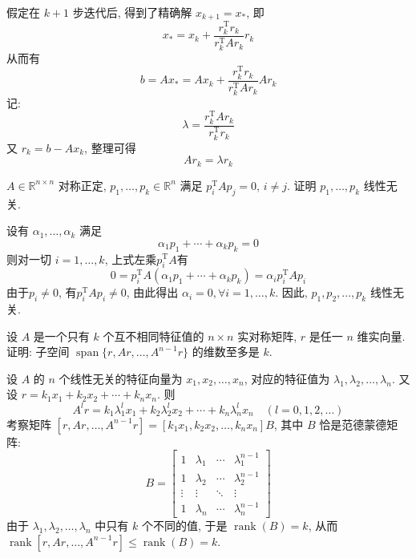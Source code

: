\documentclass[12pt, answers]{exam}     %
\newcommand{\R}{\mathbb{R}}
\newcommand{\T}{\mathrm{T}}
\begin{document}
\begin{questions}
\begin{solution}
假定在 \( k+1 \) 步迭代后, 得到了精确解 \( x_{k+1} = x_* \), 即
\[ x_* = x_k + \frac{r_k^{\T} r_k}{r_k^{\T} A r_k} r_k \]
从而有
\[ b = A x_* = A x_k + \frac{r_k^{\T} r_k}{r_k^{\T} A r_k} A r_k \]
记:
\[ \lambda = \frac{r_k^{\T} A r_k}{r_k^{\T} r_k} \]
又 $ r_k = b - A x_k $, 整理可得
\[ A r_k = \lambda r_k \]
\end{solution}

\question{}
 \( A \in \R^{n \times n} \) 对称正定, \( p_1, \ldots, p_k \in \R^n \) 满足 \( p_i^{\T} A p_j = 0 \), \( i \neq j \). 证明 \( p_1, \ldots, p_k \) 线性无关. 
\begin{solution}
设有 \( \alpha_1, \ldots, \alpha_k \) 满足
\[
\alpha_1 p_1 + \cdots + \alpha_k p_k = 0
\]
则对一切 \( i = 1, \ldots, k \), 上式左乘\(p_i^{\T} A\)有
\[
0 = p_i^{\T} A (\alpha_1 p_1 + \cdots + \alpha_k p_k) = \alpha_i p_i^{\T} A p_i
\]
由于\(p_i \ne 0\), 有\( p_i^{\T} A p_i \neq 0 \), 由此得出 \( \alpha_i = 0, \forall i = 1, \ldots, k \). 因此, \( p_1, p_2, \ldots, p_k \) 线性无关. 
\end{solution}

\question{}设 \( A \) 是一个只有 \( k \) 个互不相同特征值的 \( n \times n \) 实对称矩阵, \( r \) 是任一 \( n \) 维实向量. 证明: 子空间 \( \operatorname{span}\{r, Ar, \ldots, A^{n-1}r\} \) 的维数至多是 \( k \). 

\begin{solution}
设 \( A \) 的 \( n \) 个线性无关的特征向量为 \( x_1, x_2, \ldots, x_n \), 对应的特征值为 \( \lambda_1, \lambda_2, \ldots, \lambda_n \). 又设 \( r = k_1x_1 + k_2x_2 + \cdots + k_nx_n \). 则
\[
A^l r = k_1 \lambda_1^l x_1 + k_2 \lambda_2^l x_2 + \cdots + k_n \lambda_n^l x_n \quad (l = 0, 1, 2, \ldots)
\]
考察矩阵 \([r, Ar, \ldots, A^{n-1}r] = [k_1x_1, k_2x_2, \ldots, k_nx_n] B\), 其中 \( B \) 恰是范德蒙德矩阵: 
\[
B = \begin{bmatrix} 
1 & \lambda_1 & \cdots & \lambda_1^{n-1} \\ 
1 & \lambda_2 & \cdots & \lambda_2^{n-1} \\ 
\vdots & \vdots & \ddots & \vdots \\ 
1 & \lambda_n & \cdots & \lambda_n^{n-1} 
\end{bmatrix}
\]
由于 \( \lambda_1, \lambda_2, \ldots, \lambda_n \) 中只有 \( k \) 个不同的值, 于是 \( \operatorname{rank}(B) = k \), 从而 \( \operatorname{rank}[r, Ar, \ldots, A^{n-1}r] \leq \operatorname{rank}(B) = k \). 


\end{solution}
\end{questions}
\end{document}
